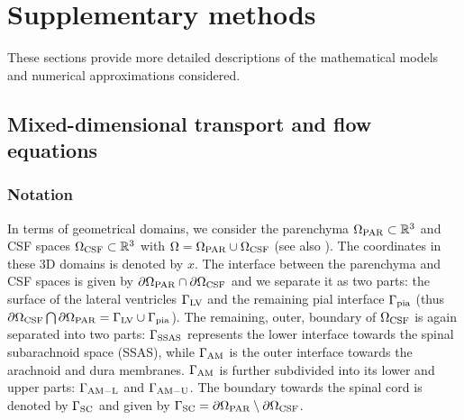 \section{Supplementary methods}

These sections provide more detailed descriptions of the mathematical models and numerical approximations considered.

\subsection{Mixed-dimensional transport and flow equations}
\label{sec:more_maths}

\subsubsection{Notation}

In terms of geometrical domains, we consider the parenchyma
$\Omega_{\rm PAR} \subset \mathbb{R}^3$ and CSF spaces $\Omega_{\rm CSF}
\subset \mathbb{R}^3$ with $\Omega = \Omega_{\rm PAR} \cup \Omega_{\rm CSF}$
(see also ). The coordinates in these
3D domains is denoted by $x$. The interface between the parenchyma and
CSF spaces is given by $\partial \Omega_{\rm PAR} \cap \partial
\Omega_{\rm CSF}$ and we separate it as two parts: the surface of the
lateral ventricles $\Gamma_{\rm LV}$ and the remaining pial interface
$\Gamma_{\rm pia}$ (thus $\partial \Omega_{\rm CSF} \bigcap \partial
\Omega_{\rm PAR} = \Gamma_{\rm LV} \cup \Gamma_{\rm pia}$). The
remaining, outer, boundary of $\Omega_{\rm CSF}$ is again separated
into two parts: $\Gamma_{\rm SSAS}$ represents the lower interface
towards the spinal subarachnoid space (SSAS), while $\Gamma_{\rm AM}$
is the outer interface towards the arachnoid and dura
membranes. $\Gamma_{\rm AM}$ is further subdivided into its lower and
upper parts: $\Gamma_{\rm AM-L}$ and $\Gamma_{\rm AM-U}$. The boundary
towards the spinal cord is denoted by $\Gamma_{\rm{SC}}$ and given by
$\Gamma_{\rm{SC}} = \partial \Omega_{\rm PAR} \setminus \partial
\Omega_{\rm CSF}$.


